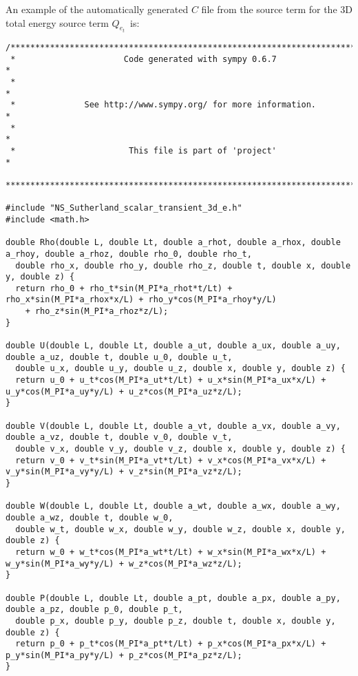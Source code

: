 \documentclass[10pt]{article}
\begin{document}
An example of the automatically generated $C$ file from the source term for the 3D total energy source term $Q_{e_t}$~is:

\begin{footnotesize}
\begin{verbatim}
/****************************************************************************** 
 *                      Code generated with sympy 0.6.7                       * 
 *                                                                            * 
 *              See http://www.sympy.org/ for more information.               * 
 *                                                                            * 
 *                       This file is part of 'project'                       * 
 ******************************************************************************/

#include "NS_Sutherland_scalar_transient_3d_e.h"
#include <math.h>

double Rho(double L, double Lt, double a_rhot, double a_rhox, double a_rhoy, double a_rhoz, double rho_0, double rho_t, 
  double rho_x, double rho_y, double rho_z, double t, double x, double y, double z) {
  return rho_0 + rho_t*sin(M_PI*a_rhot*t/Lt) + rho_x*sin(M_PI*a_rhox*x/L) + rho_y*cos(M_PI*a_rhoy*y/L) 
	+ rho_z*sin(M_PI*a_rhoz*z/L);
}

double U(double L, double Lt, double a_ut, double a_ux, double a_uy, double a_uz, double t, double u_0, double u_t, 
  double u_x, double u_y, double u_z, double x, double y, double z) {
  return u_0 + u_t*cos(M_PI*a_ut*t/Lt) + u_x*sin(M_PI*a_ux*x/L) + u_y*cos(M_PI*a_uy*y/L) + u_z*cos(M_PI*a_uz*z/L);
}

double V(double L, double Lt, double a_vt, double a_vx, double a_vy, double a_vz, double t, double v_0, double v_t, 
  double v_x, double v_y, double v_z, double x, double y, double z) {
  return v_0 + v_t*sin(M_PI*a_vt*t/Lt) + v_x*cos(M_PI*a_vx*x/L) + v_y*sin(M_PI*a_vy*y/L) + v_z*sin(M_PI*a_vz*z/L);
}

double W(double L, double Lt, double a_wt, double a_wx, double a_wy, double a_wz, double t, double w_0, 
  double w_t, double w_x, double w_y, double w_z, double x, double y, double z) {
  return w_0 + w_t*cos(M_PI*a_wt*t/Lt) + w_x*sin(M_PI*a_wx*x/L) + w_y*sin(M_PI*a_wy*y/L) + w_z*cos(M_PI*a_wz*z/L);
}

double P(double L, double Lt, double a_pt, double a_px, double a_py, double a_pz, double p_0, double p_t, 
  double p_x, double p_y, double p_z, double t, double x, double y, double z) {
  return p_0 + p_t*cos(M_PI*a_pt*t/Lt) + p_x*cos(M_PI*a_px*x/L) + p_y*sin(M_PI*a_py*y/L) + p_z*cos(M_PI*a_pz*z/L);
}


\end{verbatim}
\end{footnotesize}
\end{document}
